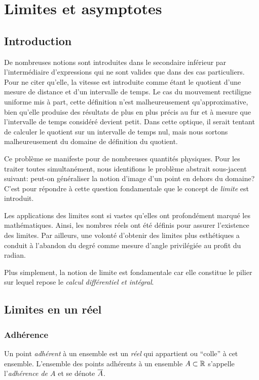 \documentclass[main.tex]{subfiles}
\begin{document}
\chapter{Limites et asymptotes}

\section{Introduction}

De nombreuses notions sont introduites dans le secondaire inférieur par l'intermédiaire d'expressions
qui ne sont valides que dans des cas particuliers.
Pour ne citer qu'elle,
la vitesse est introduite comme étant le quotient d'une mesure de distance et d'un intervalle de temps.
Le cas du mouvement rectiligne uniforme mis à part,
cette définition n'est malheureusement qu'approximative,
bien qu'elle produise des résultats de plus en plus précis
au fur et à mesure que l'intervalle de temps considéré devient petit.
Dans cette optique,
il serait tentant de calculer le quotient sur un intervalle de temps nul,
mais nous sortons malheureusement du domaine de définition du quotient.

Ce problème se manifeste pour de nombreuses quantités physiques.
Pour les traiter toutes simultanément,
nous identifions le problème abstrait sous-jacent suivant:
peut-on généraliser la notion d'image d'un point en dehors du domaine?
C'est pour répondre à cette question fondamentale que le concept de \emph{limite} est introduit.

Les applications des limites sont si vastes
qu'elles ont profondément marqué les mathématiques.
Ainsi, les nombres réels ont été définis pour assurer l'existence des limites.
Par ailleurs,
une volonté d'obtenir des limites plus esthétiques a conduit à l'abandon du degré comme mesure d'angle privilégiée au profit du radian.

Plus simplement,
la notion de limite est fondamentale
car elle constitue le pilier sur lequel repose le \emph{calcul différentiel et intégral}.

\section{Limites en un réel}

\subsection{Adhérence}

Un point \emph{adhérent} à un ensemble est un \emph{réel} qui appartient ou ``colle'' à cet ensemble.
L'ensemble des points adhérents à un ensemble $A \subset \mathbb{R}$
s'appelle l'\emph{adhérence de $A$} et se dénote $\overline{A}$.
\end{document}
